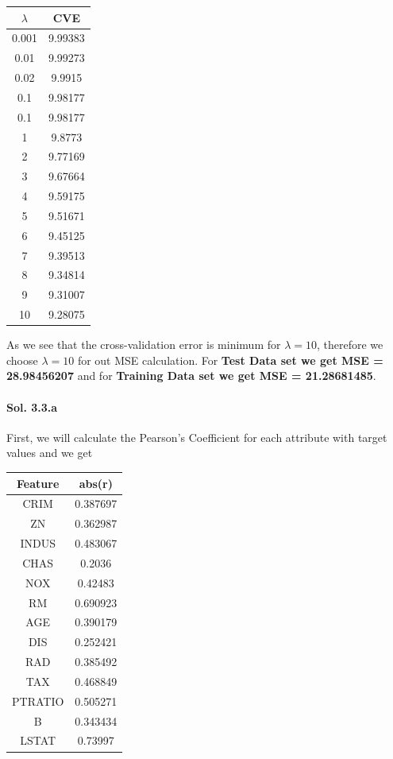 \documentclass[]{report}
\begin{document}
		

		\begin{center}
		\begin{tabular}{c|c}
		\hline
		   $\lambda$ &     CVE \\
		\hline
		    0.001 & 9.99383 \\
		    0.01  & 9.99273 \\
		    0.02  & 9.9915  \\
		    0.1   & 9.98177 \\
		    0.1   & 9.98177 \\
		    1     & 9.8773  \\
		    2     & 9.77169 \\
		    3     & 9.67664 \\
		    4     & 9.59175 \\
		    5     & 9.51671 \\
		    6     & 9.45125 \\
		    7     & 9.39513 \\
		    8     & 9.34814 \\
		    9     & 9.31007 \\
		   10     & 9.28075 \\
		\hline
		\end{tabular}
		\end{center}

		As we see that the cross-validation error is minimum for $\lambda = 10$, therefore we choose $\lambda = 10$ for out MSE calculation.
		For \textbf{Test Data set we get MSE = 28.98456207} and for \textbf{Training Data set we get MSE = 21.28681485}.
		
		\paragraph{Sol. 3.3.a}
		First, we will calculate the Pearson's Coefficient for each attribute with target values and we get 
		\begin{center}
		\begin{tabular}{c | c}
			\hline
			 Feature   &   abs(r) \\
			\hline
			 CRIM      & 0.387697 \\
			 ZN        & 0.362987 \\
			 INDUS     & 0.483067 \\
			 CHAS      & 0.2036   \\
			 NOX       & 0.42483  \\
			 RM        & 0.690923 \\
			 AGE       & 0.390179 \\
			 DIS       & 0.252421 \\
			 RAD       & 0.385492 \\
			 TAX       & 0.468849 \\
			 PTRATIO   & 0.505271 \\
			 B         & 0.343434 \\
			 LSTAT     & 0.73997  \\
			\hline
			\end{tabular}
		\end{center}
\end{document}
